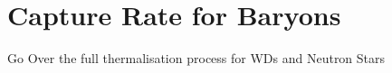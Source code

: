 \graphicspath{{img/chapter_4/}}

\chapter{Capture Rate for Baryons}
\label{chapter:capture_2}

\begin{synopsis}
  Go Over the full thermalisation process for WDs and Neutron Stars
\end{synopsis}
